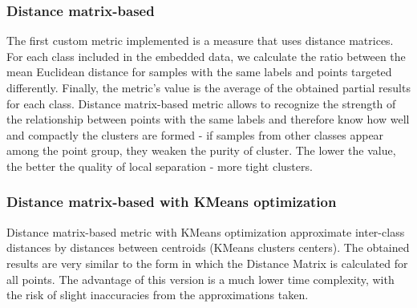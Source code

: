 \documentclass[12pt]{article}
\begin{document}
\subsubsection{Distance matrix-based}
The first custom metric implemented is a measure that uses distance matrices. For each class included in the embedded data, we calculate the ratio between the mean Euclidean distance for samples with the same labels and points targeted differently. Finally, the metric's value is the average of the obtained partial results for each class. Distance matrix-based metric allows to recognize the strength of the relationship between points with the same labels and therefore know how well and compactly the clusters are formed - if samples from other classes appear among the point group, they weaken the purity of cluster. The lower the value, the better the quality of local separation - more tight clusters.

\subsubsection{Distance matrix-based with KMeans optimization}
Distance matrix-based metric with KMeans optimization approximate inter-class distances by distances between centroids (KMeans clusters centers). The obtained results are very similar to the form in which the Distance Matrix is calculated for all points. The advantage of this version is a much lower time complexity, with the risk of slight inaccuracies from the approximations taken.
\end{document}
